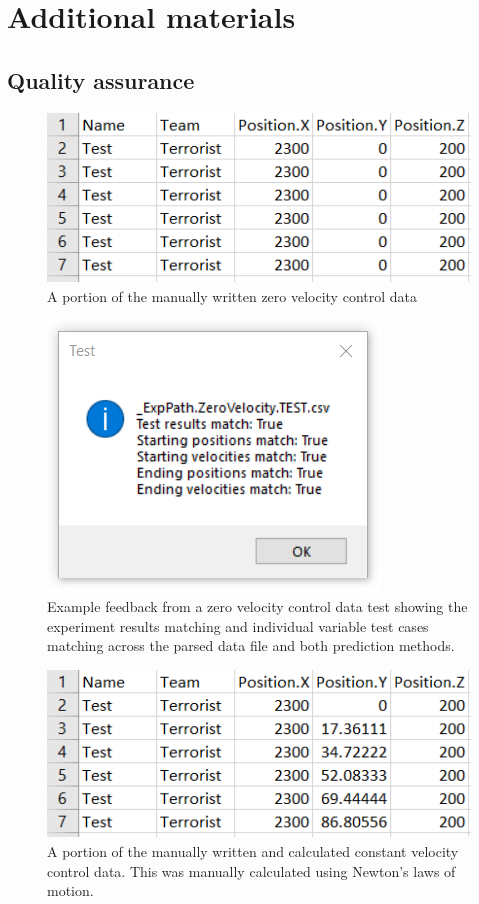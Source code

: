 \documentclass[journal]{IEEEtran}
\begin{document}
\section{Additional materials}

\subsection{Quality assurance}

\begin{figure}[h]
    \includegraphics[width=0.7\linewidth]{TestZeroVelocityRawData.png}
    \caption{A portion of the manually written zero velocity control data}
\end{figure}

\begin{figure}[h]
    \centering
    \includegraphics[width=0.7\linewidth]{TestZero.png}
    \caption{Example feedback from a zero velocity control data test showing the experiment results matching and individual variable test cases matching across the parsed data file and both prediction methods.}
    \label{fig:testzero}
\end{figure}

\begin{figure}[h]
    \includegraphics[width=0.7\linewidth]{TestConstantVelocityRawData.png}
    \caption{A portion of the manually written and calculated constant velocity control data. This was manually calculated using Newton's laws of motion.}
\end{figure}
\end{document}
